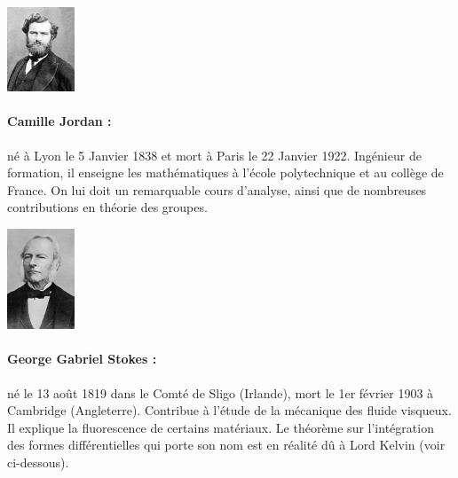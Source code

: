 \begin{minipage}{0.2\linewidth}
\begin{center}\includegraphics[width=2cm]{images/Jordan.jpg}\end{center}
\end{minipage}
\begin{minipage}{0.80\linewidth}
\small{\paragraph*{Camille Jordan :} né à Lyon le 5 Janvier 1838 et mort à Paris le 22 Janvier 1922. Ingénieur de formation, il enseigne les mathématiques à l'école polytechnique et au collège de France. On lui doit un remarquable cours d'analyse, ainsi que de nombreuses contributions en théorie des groupes.}
\end{minipage}
\vfill

\begin{minipage}{0.2\linewidth}
 \begin{center}\includegraphics[width=2cm]{images/Stokes.jpg}\end{center}
\end{minipage}
\begin{minipage}{0.80\linewidth}
\small{\paragraph*{George Gabriel Stokes :} né le  	13 août 1819 dans le Comté de Sligo (Irlande), mort le 1er février 1903 à Cambridge (Angleterre). Contribue à l'étude de la mécanique des fluide visqueux. Il explique la fluorescence de certains matériaux. Le théorème sur l'intégration des formes différentielles qui porte son nom est en réalité dû à Lord Kelvin (voir ci-dessous).}
\end{minipage}
\vfill

